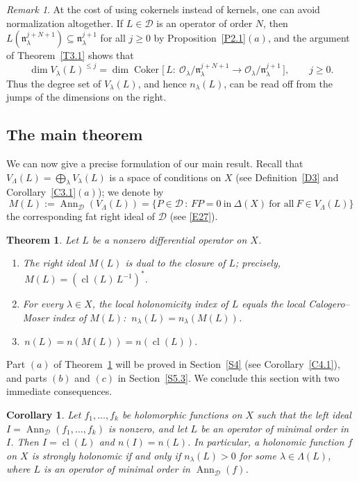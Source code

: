 \documentclass[11pt,reqno]{amsart}
\theoremstyle{plain}
\newtheorem{theorem}{Theorem}[section]
\newtheorem{corollary}{Corollary}[section]
\theoremstyle{definition}
\theoremstyle{remark}
\newtheorem*{remark}{Remark}
\numberwithin{equation}{section}
\newcommand{\cD}{\mathcal{D}}
\newcommand{\cO}{\mathcal{O}}
\newcommand{\nl}{\mathfrak{n}_\lambda}
\DeclareMathOperator{\Ann}{Ann}
\DeclareMathOperator{\cl}{cl}
\DeclareMathOperator{\Coker}{Coker}
\begin{document}
\begin{remark}
At the cost of using cokernels instead of kernels, one can avoid normalization altogether. If
$L \in \cD$ is an operator of order $N$, then $L(\nl^{j+N+1}) \subseteq \nl^{j+1}$ for all
$j \ge 0$ by Proposition~\ref{P2.1}$(a)$, and the argument of Theorem~\ref{T3.1} shows that
\[
  \dim V_\lambda(L)^{\le j} = \dim \Coker\bigl[\, L : \ \cO_\lambda/\nl^{j+N+1} \to
  \cO_\lambda/\nl^{j+1} \,\bigr] , \qquad j \ge 0 .
\]
Thus the degree set of $V_\lambda(L)$, and hence $n_\lambda(L)$, can be read off from the jumps of
the dimensions on the right.
\end{remark}

\subsection{The main theorem}
\label{S3.5}
We can now give a precise formulation of our main result. Recall that $V_\Lambda(L) =
\bigoplus_{\lambda} V_\lambda(L)$ is a space of conditions on $X$ (see Definition~\ref{D3} and
Corollary~\ref{C3.1}$(a)$); we denote by
\begin{equation}
\label{E38}
  M(L) := \Ann_{\cD}(V_\Lambda(L)) = \{ P \in \cD \, : \, F P = 0 \ \text{in}\ \Delta(X) \
  \text{for all}\ F \in V_\Lambda(L) \}
\end{equation}
the corresponding fat right ideal of $\cD$ (see \eqref{E27}).

\begin{theorem}
\label{T3.2}
Let $L$ be a nonzero differential operator on $X$.
\begin{enumerate}
\item[$(a)$] The right ideal $M(L)$ is dual to the closure of $L$; precisely,
$\,M(L) = (\cl(L)\, L^{-1})^*$.
\item[$(b)$] For every $\lambda \in X$, the local holonomicity index of $L$ equals the local
Calogero--Moser index of $M(L)$: $\ n_\lambda(L) = n_\lambda(M(L))$.
\item[$(c)$] $\,n(L) = n(M(L)) = n(\cl(L))$.
\end{enumerate}
\end{theorem}

Part $(a)$ of Theorem~\ref{T3.2} will be proved in Section~\ref{S4} (see Corollary~\ref{C4.1}),
and parts $(b)$ and $(c)$ in Section~\ref{S5.3}. We conclude this section with two immediate
consequences.

\begin{corollary}
\label{C3.2}
Let $f_1, \ldots, f_k$ be holomorphic functions on $X$ such that the left ideal
$I = \Ann_{\cD}(f_1, \ldots, f_k)$ is nonzero, and let $L$ be an operator of minimal order in $I$.
Then $I = \cl(L)$ and $n(I) = n(L)$. In particular, a holonomic function $f$ on $X$ is strongly
holonomic if and only if $n_\lambda(L) > 0$ for some $\lambda \in \Lambda(L)$, where $L$ is an
operator of minimal order in $\Ann_{\cD}(f)$.
\end{corollary}
\end{document}
